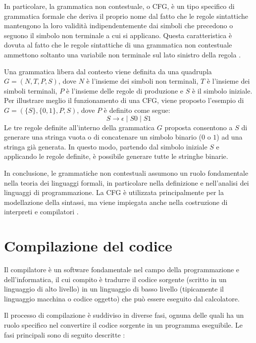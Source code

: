 \documentclass[12pt,a4paper,openright,twoside]{book}
\begin{document}
In particolare, la grammatica non contestuale, o \ac{CFG}, è un tipo specifico di grammatica formale che deriva il proprio nome dal fatto che 
le regole sintattiche mantengono la loro validità indipendentemente dai simboli che precedono o seguono il simbolo non terminale a cui si 
applicano. Questa caratteristica è dovuta al fatto che le regole sintattiche di una grammatica non contestuale ammettono soltanto una variabile 
non terminale sul lato sinistro della regola \cite{Linz2022}.

Una grammatica libera dal contesto viene definita da una quadrupla 
$G = (N, T, P, S)$, dove $N$ è l’insieme dei simboli non terminali, $T$ è l’insieme dei simboli terminali, $P$ è l’insieme delle regole di 
produzione e $S$ è il simbolo iniziale. Per illustrare meglio il funzionamento di una CFG, viene proposto l’esempio di 
$G = (\{S\}, \{0, 1\}, P, S)$, dove $P$ è definito come segue:
\begin{equation*}
S \rightarrow \epsilon \mid S0 \mid S1
\end{equation*}
Le tre regole definite all’interno della grammatica $G$ proposta consentono a $S$ di generare una stringa vuota o di concatenare un simbolo 
binario ($0$ o $1$) ad una stringa già generata. In questo modo, partendo dal simbolo iniziale $S$ e applicando le regole definite, è possibile 
generare tutte le stringhe binarie.

In conclusione, le grammatiche non contestuali assumono un ruolo fondamentale nella teoria dei linguaggi formali, in particolare nella 
definizione e nell’analisi dei linguaggi di programmazione. La \ac{CFG} è utilizzata principalmente per la modellazione della sintassi, ma 
viene impiegata anche nella costruzione di interpreti e compilatori \cite{Linz2022}.

\section{Compilazione del codice}
Il compilatore è un software fondamentale nel campo della programmazione e dell’informatica, il cui compito è tradurre il codice sorgente 
(scritto in un linguaggio di alto livello) in un linguaggio di basso livello (tipicamente il linguaggio macchina o codice oggetto) che può 
essere eseguito 
dal calcolatore.

Il processo di compilazione è suddiviso in diverse fasi, ognuna delle quali ha un ruolo specifico nel convertire il codice sorgente in un 
programma eseguibile. Le fasi principali sono di seguito descritte \cite{Aho2006}:
\end{document}

